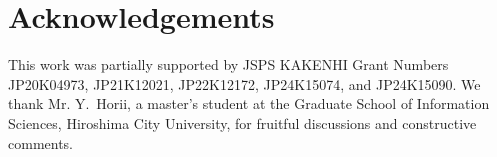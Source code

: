 \section*{Acknowledgements}
This work was partially supported by JSPS KAKENHI Grant Numbers JP20K04973, JP21K12021, JP22K12172, JP24K15074, and JP24K15090. 
We thank Mr. Y.~Horii, a master's student at the Graduate School of Information Sciences, Hiroshima City University, for fruitful discussions and constructive comments.%
